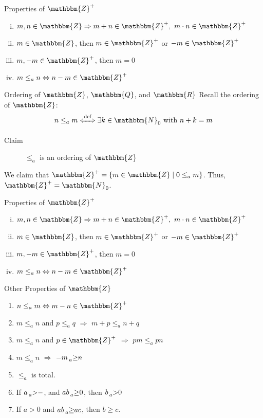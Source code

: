 \documentclass[10pt]{extarticle}
\newcommand{\N}{\mathbbm{N}}
\newcommand{\Q}{\mathbbm{Q}}
\newcommand{\Z}{\mathbbm{Z}}
\newcommand{\R}{\mathbbm{R}}
\begin{document}
  \begin{problem}{Properties of $\Z^+$}
    \begin{enumerate}[(i)]
      \item $m,n\in \Z\Rightarrow m+n\in\Z^+,~m\cdot n\in \Z^+$
      \item $m\in \Z$, then $m\in \Z^+$ or $-m\in\Z^+$
      \item $m,-m\in \Z^+$, then $m=0$
      \item $m\leq_a n \Leftrightarrow n-m\in\Z^+$
    \end{enumerate}
  \end{problem}
  \begin{problem}{Ordering of $\Z$, $\Q$, and $\R$}
    Recall the ordering of $\Z$:
    \[
      n\leq_a m \xLeftrightarrow{\text{def}} \exists k\in \N_0~\text{with } n+k=m
    \] 
    \begin{description}
      \item[Claim] $\leq_a$ is an ordering of $\Z$
    \end{description}
    We claim that $\Z^+ = \{m\in\Z\mid 0\leq_a m\}$. Thus, $\Z^+ = \N_0$.
    \begin{problem}{Properties of $\Z^+$}
      \begin{enumerate}[(i)]
        \item $m,n\in \Z\Rightarrow m+n\in\Z^+,~m\cdot n\in \Z^+$
        \item $m\in \Z$, then $m\in \Z^+$ or $-m\in\Z^+$
        \item $m,-m\in \Z^+$, then $m=0$
        \item $m\leq_a n \Leftrightarrow n-m\in\Z^+$
      \end{enumerate}
    \end{problem}
    \begin{problem}{Other Properties of $\Z$}
      \begin{enumerate}[(\arabic*)]
        \item $n\leq_a m\Leftrightarrow m-n\in\Z^+$
        \item $m\leq_a n$ and $p\leq_a q$ $\Rightarrow$ $m+p \leq_a n+q$
        \item $m\leq_a n$ and $p\in \Z^+$ $\Rightarrow$ $pm\leq_a pn$
        \item $m\leq_a n$ $\Rightarrow$ $-m \prescript{}{a}\geq n$
        \item $\leq_a$ is total.
        \item If $a \prescript{}{a}>-$, and $ab \prescript{}{a}\geq 0$, then $b\prescript{}{a}>0$
        \item If $a > 0$ and $ab \prescript{}{a}\geq ac$, then $b\geq c$.

\end{enumerate}
\end{problem}
\end{problem}
\end{document}
